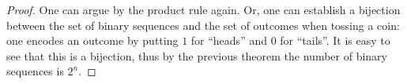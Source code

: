 \begin{proof}
One can argue by the product rule again.
Or, one can establish a bijection between the set of binary sequences and the set of outcomes when tossing a coin:
one encodes an outcome by putting $1$ for ``heads'' and $0$ for ``tails''.
It is easy to see that this is a bijection, thus by the previous theorem the number of binary sequences is $2^n$.
\end{proof}
